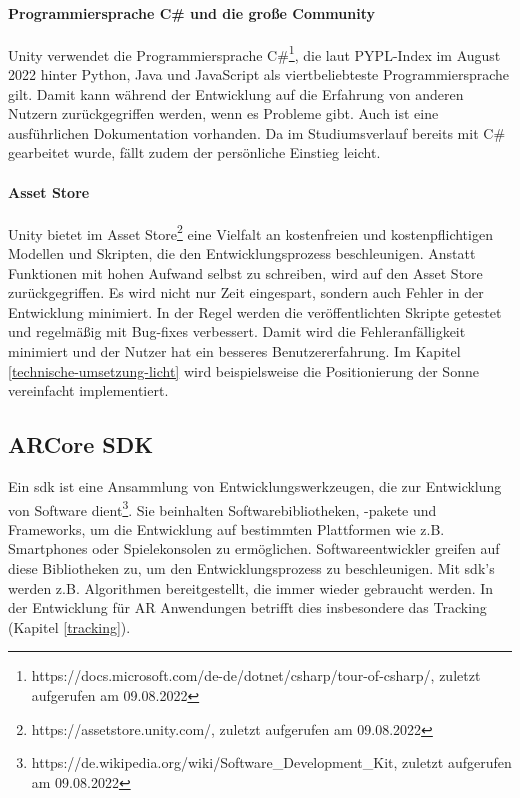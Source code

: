 \paragraph*{Programmiersprache C\# und die große Community}
Unity verwendet die Programmiersprache C\#\footnote{https://docs.microsoft.com/de-de/dotnet/csharp/tour-of-csharp/, zuletzt aufgerufen am 09.08.2022}, die laut PYPL-Index im August 2022 hinter Python, Java und JavaScript als viertbeliebteste Programmiersprache gilt\cite*[PYPL,][]{PYPLStatista2022}. Damit kann während der Entwicklung auf die Erfahrung von anderen Nutzern zurückgegriffen werden, wenn es Probleme gibt. Auch ist eine ausführlichen Dokumentation vorhanden. Da im Studiumsverlauf bereits mit C\# gearbeitet wurde, fällt zudem der persönliche Einstieg leicht.

\paragraph*{Asset Store}
Unity bietet im Asset Store\footnote{https://assetstore.unity.com/, zuletzt aufgerufen am 09.08.2022} eine Vielfalt an kostenfreien und kostenpflichtigen Modellen und Skripten, die den Entwicklungsprozess beschleunigen. Anstatt Funktionen mit hohen Aufwand selbst zu schreiben, wird auf den Asset Store zurückgegriffen. Es wird nicht nur Zeit eingespart, sondern auch Fehler in der Entwicklung minimiert. In der Regel werden die veröffentlichten Skripte getestet und regelmäßig mit Bug-fixes verbessert. Damit wird die Fehleranfälligkeit minimiert und der Nutzer hat ein besseres Benutzererfahrung. Im Kapitel \ref*{technische-umsetzung-licht} wird beispielsweise die Positionierung der Sonne vereinfacht implementiert.

\subsection{ARCore SDK}
\label{technische-umsetzung-arcore}
Ein \acrfull{sdk} ist eine Ansammlung von Entwicklungswerkzeugen, die zur Entwicklung von Software dient\footnote{https://de.wikipedia.org/wiki/Software\_Development\_Kit, zuletzt aufgerufen am 09.08.2022}. Sie beinhalten Softwarebibliotheken, -pakete und Frameworks, um die Entwicklung auf bestimmten Plattformen wie z.B. Smartphones oder Spielekonsolen zu ermöglichen. Softwareentwickler greifen auf diese Bibliotheken zu, um den Entwicklungsprozess zu beschleunigen. Mit \acrshort{sdk}'s werden z.B. Algorithmen bereitgestellt, die immer wieder gebraucht werden. In der Entwicklung für AR Anwendungen betrifft dies insbesondere das Tracking (Kapitel \ref*{tracking}).

